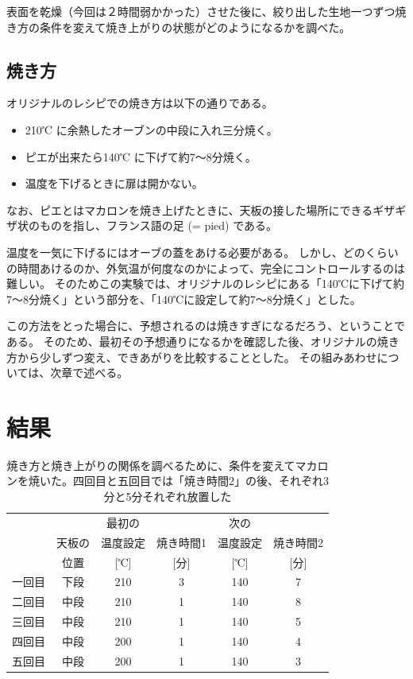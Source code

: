 \documentclass[uplatex,dvipdfmx,a4j,12pt]{jsarticle}
\begin{document}
表面を乾燥（今回は２時間弱かかった）させた後に、絞り出した生地一つずつ焼き方の条件を変えて焼き上がりの状態がどのようになるかを調べた。

\subsection{焼き方}

オリジナルのレシピでの焼き方は以下の通りである。
\begin{itemize}
    \item 210℃ に余熱したオーブンの中段に入れ三分焼く。

    \item ピエが出来たら140℃ に下げて約7～8分焼く。
    \item 温度を下げるときに扉は開かない。    
\end{itemize}
なお、ピエとはマカロンを焼き上げたときに、天板の接した場所にできるギザギザ状のものを指し、フランス語の足 (= pied) である。

温度を一気に下げるにはオーブの蓋をあける必要がある。
しかし、どのくらいの時間あけるのか、外気温が何度なのかによって、完全にコントロールするのは難しい。
そのためこの実験では、オリジナルのレシピにある「140℃に下げて約7〜8分焼く」という部分を、「140℃に設定して約7〜8分焼く」とした。

この方法をとった場合に、予想されるのは焼きすぎになるだろう、ということである。
そのため、最初その予想通りになるかを確認した後、オリジナルの焼き方から少しずつ変え、できあがりを比較することとした。
その組みあわせについては、次章で述べる。


\section{結果}


\begin{table}[t]
    \centering
    \caption{焼き方と焼き上がりの関係を調べるために、条件を変えてマカロンを焼いた。四回目と五回目では「焼き時間2」の後、それぞれ3分と5分それぞれ放置した}
    \begin{tabular}{cccccc}
    	&       & 最初の   &         & 次の     &  \\
        & 天板の & 温度設定 & 焼き時間1 & 温度設定 &焼き時間2 \\
        & 位置 & [℃]    & [分]     & [℃]   & [分] \\
        \hline
    一回目 &	下段 & 210 & 3 & 140 & 7 \\
    二回目 & 中段 & 210 & 1 & 140 & 8 \\
    三回目 & 中段 & 210 & 1 & 140 & 5 \\
    四回目 & 中段 & 200 & 1 & 140 & 4 \\
    五回目 & 中段 & 200 & 1 & 140 & 3 \\
        \hline
    \end{tabular}
    \label{table:combination}
\end{table}
\end{document}
